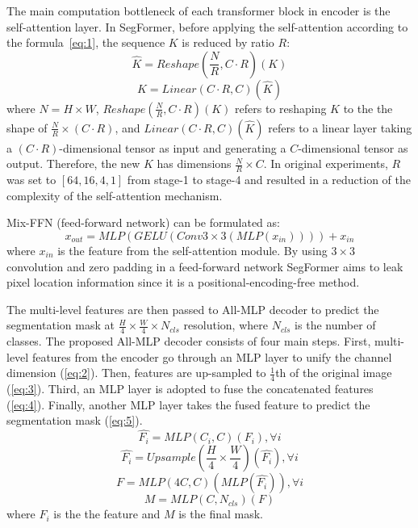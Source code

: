 The main computation bottleneck of each transformer block in encoder is the self-attention layer. In SegFormer, before applying the self-attention according to the formula~\ref{eq:1}, the sequence $K$ is reduced by ratio $R$:
$$\hat{K} = Reshape(\frac{N}{R}, C\cdot R)(K)$$
$$K = Linear(C \cdot R, C)(\hat{K})$$
where $N = H \times W$, $Reshape(\frac{N}{R}, C \cdot R)(K)$ refers to reshaping $K$ to the the shape of $\frac{N}{R} \times (C \cdot R)$, and $Linear(C \cdot R, C)(\hat{K})$ refers to a linear layer taking a $(C \cdot R)$-dimensional tensor as input and generating a $C$-dimensional tensor as output. Therefore, the new $K$ has dimensions $\frac{N}{R} \times C$. 
In original experiments, $R$ was set to $[64, 16, 4, 1]$ from stage-1 to stage-4 and
resulted in a reduction of the complexity of the self-attention mechanism.

Mix-FFN (feed-forward network) can be formulated as:
$$x_{out} = MLP(GELU(Conv 3\times 3(MLP(x_{in})))) + x_{in}$$
where $x_{in}$ is the feature from the self-attention module. By using $3 \times 3$ convolution and zero padding in a feed-forward network SegFormer aims to leak pixel location information since it is a positional-encoding-free method.


The multi-level features are then passed to All-MLP decoder to predict the segmentation mask at $\frac{H}{4}\times \frac{W}{4}\times N_{cls}$ resolution, where $N_{cls}$ is the number of classes.
The proposed All-MLP decoder consists of four main steps. First, multi-level features from
the encoder go through an MLP layer to unify the channel dimension (\ref{eq:2}). Then, features are up-sampled to $\frac{1}{4}$th of the original image (\ref{eq:3}). Third, an MLP layer is adopted to fuse the concatenated features (\ref{eq:4}). Finally, another MLP layer takes the fused feature to predict the segmentation mask (\ref{eq:5}).
\begin{equation} \label{eq:2}
\hat{F_i} = MLP(C_i, C)(F_i), \forall i
\end{equation}
\begin{equation} \label{eq:3}
\hat{F_i} = Upsample(\frac{H}{4}\times \frac{W}{4})(\hat{F_i}), \forall i
\end{equation}
\begin{equation} \label{eq:4}
F = MLP(4C, C)(MLP(\hat{F_i})), \forall i
\end{equation}
\begin{equation} \label{eq:5}
M = MLP(C, N_{cls})(F)
\end{equation}
where $F_i$ is the the feature and $M$ is the final mask.

